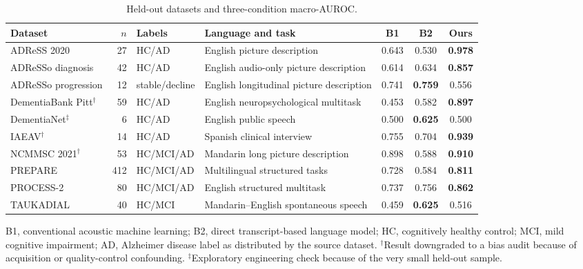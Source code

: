 \documentclass[pdflatex,sn-nature]{sn-jnl}
\begin{document}
\begin{table}[t]
\caption{Held-out datasets and three-condition macro-AUROC.}\label{tab:datasets}
\centering
\begin{threeparttable}
\scriptsize
\begin{tabularx}{\textwidth}{lrlXccc}
\toprule
Dataset & $n$ & Labels & Language and task & B1 & B2 & Ours \\
\midrule
ADReSS 2020 & 27 & HC/AD & English picture description & 0.643 & 0.530 & \textbf{0.978} \\
ADReSSo diagnosis & 42 & HC/AD & English audio-only picture description & 0.614 & 0.634 & \textbf{0.857} \\
ADReSSo progression & 12 & stable/decline & English longitudinal picture description & 0.741 & \textbf{0.759} & 0.556 \\
DementiaBank Pitt$^{\dagger}$ & 59 & HC/AD & English neuropsychological multitask & 0.453 & 0.582 & \textbf{0.897} \\
DementiaNet$^{\ddagger}$ & 6 & HC/AD & English public speech & 0.500 & \textbf{0.625} & 0.500 \\
IAEAV$^{\dagger}$ & 14 & HC/AD & Spanish clinical interview & 0.755 & 0.704 & \textbf{0.939} \\
NCMMSC 2021$^{\dagger}$ & 53 & HC/MCI/AD & Mandarin long picture description & 0.898 & 0.588 & \textbf{0.910} \\
PREPARE & 412 & HC/MCI/AD & Multilingual structured tasks & 0.728 & 0.584 & \textbf{0.811} \\
PROCESS-2 & 80 & HC/MCI/AD & English structured multitask & 0.737 & 0.756 & \textbf{0.862} \\
TAUKADIAL & 40 & HC/MCI & Mandarin--English spontaneous speech & 0.459 & \textbf{0.625} & 0.516 \\
\bottomrule
\end{tabularx}
\begin{tablenotes}[flushleft]
\footnotesize
\item B1, conventional acoustic machine learning; B2, direct transcript-based language model; HC, cognitively healthy control; MCI, mild cognitive impairment; AD, Alzheimer disease label as distributed by the source dataset. $^{\dagger}$Result downgraded to a bias audit because of acquisition or quality-control confounding. $^{\ddagger}$Exploratory engineering check because of the very small held-out sample.
\end{tablenotes}
\end{threeparttable}
\end{table}
\end{document}

